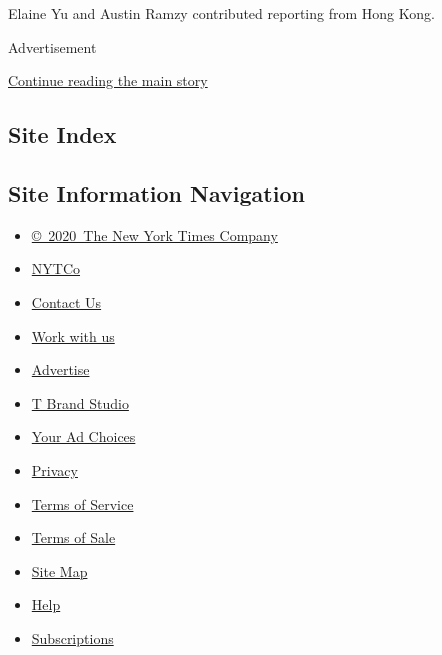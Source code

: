 Elaine Yu and Austin Ramzy contributed reporting from Hong Kong.

Advertisement

\protect\hyperlink{after-bottom}{Continue reading the main story}

\hypertarget{site-index}{%
\subsection{Site Index}\label{site-index}}

\hypertarget{site-information-navigation}{%
\subsection{Site Information
Navigation}\label{site-information-navigation}}

\begin{itemize}
\tightlist
\item
  \href{https://help.nytimes3xbfgragh.onion/hc/en-us/articles/115014792127-Copyright-notice}{©~2020~The
  New York Times Company}
\end{itemize}

\begin{itemize}
\tightlist
\item
  \href{https://www.nytco.com/}{NYTCo}
\item
  \href{https://help.nytimes3xbfgragh.onion/hc/en-us/articles/115015385887-Contact-Us}{Contact
  Us}
\item
  \href{https://www.nytco.com/careers/}{Work with us}
\item
  \href{https://nytmediakit.com/}{Advertise}
\item
  \href{http://www.tbrandstudio.com/}{T Brand Studio}
\item
  \href{https://www.nytimes3xbfgragh.onion/privacy/cookie-policy\#how-do-i-manage-trackers}{Your
  Ad Choices}
\item
  \href{https://www.nytimes3xbfgragh.onion/privacy}{Privacy}
\item
  \href{https://help.nytimes3xbfgragh.onion/hc/en-us/articles/115014893428-Terms-of-service}{Terms
  of Service}
\item
  \href{https://help.nytimes3xbfgragh.onion/hc/en-us/articles/115014893968-Terms-of-sale}{Terms
  of Sale}
\item
  \href{https://spiderbites.nytimes3xbfgragh.onion}{Site Map}
\item
  \href{https://help.nytimes3xbfgragh.onion/hc/en-us}{Help}
\item
  \href{https://www.nytimes3xbfgragh.onion/subscription?campaignId=37WXW}{Subscriptions}
\end{itemize}

